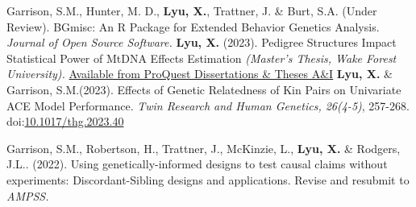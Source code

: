 

\begin{cvpublications}
  \cvpublication
    {\bullet Garrison, S.M., Hunter, M. D.,  \textbf{Lyu, X.}, Trattner, J. \& Burt, S.A. (Under Review). BGmisc: An R Package for Extended Behavior Genetics Analysis. \textit{Journal of Open Source Software.}} 
  \cvpublication
    {\bullet \textbf{Lyu, X. }(2023). Pedigree Structures Impact Statistical Power of MtDNA Effects Estimation \textit{(Master's Thesis, Wake Forest University).} \href{https://www.proquest.com/docview/2863241367}{Available from ProQuest Dissertations \& Theses A\&I}}
  \cvpublication
    {\bullet \textbf{Lyu, X.} \& Garrison, S.M.(2023). Effects of Genetic Relatedness of Kin Pairs on Univariate ACE Model Performance. \textit{Twin Research and Human Genetics, 26(4-5)}, 257-268. doi:\href{https://www-cambridge-org.colorado.idm.oclc.org/core/journals/twin-research-and-human-genetics/article/effects-of-genetic-relatedness-of-kin-pairs-on-univariate-ace-model-performance/7B99A4A34DF4F54CDF2184676C4744AD}{10.1017/thg.2023.40}} 
    
  \cvpublication
    {\bullet Garrison, S.M., Robertson, H., Trattner, J., McKinzie, L., \textbf{Lyu, X.} \& Rodgers, J.L.. (2022). Using genetically-informed designs to test causal claims without experiments: Discordant-Sibling designs and applications. Revise and resubmit to \textit{AMPSS.}}   
    
\end{cvpublications}
